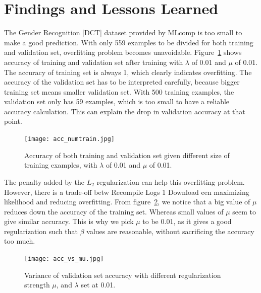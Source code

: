 \documentclass{article} %
\begin{document}
\section{Findings and Lessons Learned}
\label{sec:conclusion}


The Gender Recognition [DCT] dataset provided by MLcomp is too small to make a good prediction.
 With only 559 examples to be divided for both training and validation set, overfitting problem becomes unavoidable.
 Figure~\ref{fig:acc_numtrain} shows accuracy of training and validation set after training with $\lambda$ of 0.01 and $\mu$ of 0.01.
 The accuracy of training set is always 1, which clearly indicates overfitting.
 The accuracy of the validation set has to be interpreted carefully, because bigger training set means smaller validation set.
 With 500 training examples, the validation set only has 59 examples, which is too small to have a reliable accuracy calculation.
 This can explain the drop in validation accuracy at that point.

\begin{figure}[!ht]
\begin{center}
    \texttt{[image: acc\_numtrain.jpg]}
    \caption{Accuracy of both training and validation set given different size of training examples, with $\lambda$ of 0.01 and $\mu$ of 0.01.}
    \label{fig:acc_numtrain}
\end{center}
\end{figure}

The penalty added by the $L_2$ regularization can help this overfitting problem. However, there is a trade-off betw
Recompile Logs 1 Download
een maximizing likelihood and reducing overfitting.
 From figure~\ref{fig:acc_mu}, we notice that a big value of $\mu$ reduces down the accuracy of the training set.
 Whereas small values of $\mu$ seem to give similar accuracy.
 This is why we pick $\mu$ to be 0.01, as it gives a good regularization such that $\beta$ values are reasonable, without sacrificing the accuracy too much.

\begin{figure}[ht!]
\begin{center}
    \texttt{[image: acc\_vs\_mu.jpg]}
    \caption{Variance of validation set accuracy with different regularization strength $\mu$, and $\lambda$ set at 0.01.}
    \label{fig:acc_mu}
\end{center}
\end{figure}
\end{document}

